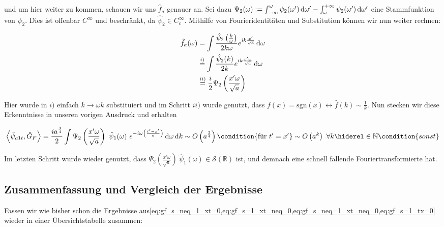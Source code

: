 und um hier weiter zu kommen, schauen wir uns $\hat f_a$ genauer an. Sei dazu
$\Psi_2(\omega) := \int_{-\infty}^\omega \psi_2(\omega ') \mathop{}\!\mathrm{d} \omega '
    -  \int_{\omega}^{+ \infty} \psi_2(\omega ') \mathop{}\!\mathrm{d} \omega '$ eine
Stammfunktion von $\psi_2$. Dies ist offenbar $C^\infty$ und beschränkt, da
 $\hat \psi_2 \in C^\infty_c$. Mithilfe von Fourieridentitäten und Substitution können wir nun weiter rechnen:

\begin{align*}
    \hat f_a (\omega) &=
    \int \frac{\hat \psi_2\left(\frac{k}{\omega}\right)}{2k\omega}
    e^{i k \frac{x'}{\sqrt{a}}}
    \mathop{}\!\mathrm{d} \omega \\
    &\stackrel{i)}{=}
    \int \frac{\hat \psi_2 (k)}{2k}e^{ik\frac{x' \omega}{\sqrt{a}}}
    \mathop{}\!\mathrm{d} \omega \\
    &\stackrel{ii)}{=} \frac{i}{2}  \Psi_2\left(\frac{x' \omega}{\sqrt{a}}\right)
\end{align*}

Hier wurde in $i)$ einfach $k \rightarrow \omega k$ substituiert und im Schritt $ii)$
wurde genutzt, dass $f(x) = \mathrm{sgn}(x) \leftrightarrow \hat f(k) \sim \frac{1}{k}$.
Nun stecken wir diese Erkenntnisse in unseren vorigen Ausdruck und erhalten

\begin{dmath}
 \left\langle \hat\psi_{a1t}, \hat G_F \right\rangle
    =
    \frac{i a^{\frac{3}{4}}}{2} \int \Psi_2\left(\frac{x' \omega}{\sqrt{a}}\right)
    ~\hat \psi_1(\omega)
    ~ e^{-i \omega \left(\frac{t'-x'}{a}\right)}
    \d \omega \d k
    \sim O\left(a^{\frac{3}{4}}\right)  \condition{\textrm{für } t'=x'}
    \sim O\left(a^k\right) ~ \forall k \hiderel \in \mathbb{N} \condition{sonst}
    \label{eq:gf_s=1_xt_neq_0}
\end{dmath}

Im letzten Schritt wurde wieder genutzt, dass
$\Psi_2\left(\frac{x' \omega}{\sqrt{a}}\right) ~\hat \psi_1(\omega) \in \mathcal{S}(\mathbb{R})$
ist, und demnach eine schnell fallende Fouriertransformierte hat.

\subsection{Zusammenfassung und Vergleich der Ergebnisse}
Fassen wir wie bisher schon die Ergebnisse aus\cref{eq:gf_s_neq_1_xt=0,eq:gf_s=1_xt_neq_0,eq:gf_s_neq=1_xt_neq_0,eq:gf_s=1_tx=0} wieder in einer Übersichtstabelle zusammen:


